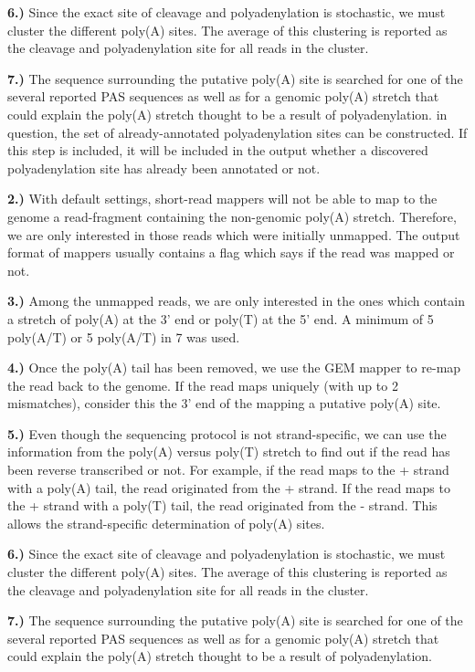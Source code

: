\textbf{6.)} Since the exact site of cleavage and polyadenylation is stochastic,
we must cluster the different poly(A) sites. The average of this clustering is
reported as the cleavage and polyadenylation site for all reads in the cluster.

\textbf{7.)} The sequence surrounding the putative poly(A) site is searched for
one of the several reported PAS sequences as well as for a genomic poly(A)
stretch that could explain the poly(A) stretch thought to be a result of
polyadenylation. in
question, the set of already-annotated polyadenylation sites can be
constructed. If this step is included, it will be included in the output
whether a discovered polyadenylation site has already been annotated or not.

\textbf{2.)} With default settings, short-read mappers will not be able to map
to the genome a read-fragment containing the non-genomic poly(A)
stretch. Therefore, we are only interested in those reads which were initially
unmapped. The output format of mappers usually contains a flag which says if
the read was mapped or not.

\textbf{3.)} Among the unmapped reads, we are only interested in the ones which
contain a stretch of poly(A) at the 3' end or poly(T) at the 5' end. A minimum
of 5 poly(A/T) or 5 poly(A/T) in 7 was used.

\textbf{4.)} Once the poly(A) tail has been removed, we use the GEM mapper to
re-map the read back to the genome. If the read maps uniquely (with up to 2
mismatches), consider this the 3' end of the mapping a putative poly(A) site.

\textbf{5.)} Even though the sequencing protocol is not strand-specific, we can
use the information from the poly(A) versus poly(T) stretch to find out if the
read has been reverse transcribed or not. For example, if the read maps to the
+ strand with a poly(A) tail, the read originated from the + strand. If the
read maps to the + strand with a poly(T) tail, the read originated from the -
strand. This allows the strand-specific determination of poly(A) sites.

\textbf{6.)} Since the exact site of cleavage and polyadenylation is stochastic,
we must cluster the different poly(A) sites. The average of this clustering is
reported as the cleavage and polyadenylation site for all reads in the cluster.

\textbf{7.)} The sequence surrounding the putative poly(A) site is searched for
one of the several reported PAS sequences as well as for a genomic poly(A)
stretch that could explain the poly(A) stretch thought to be a result of
polyadenylation.


